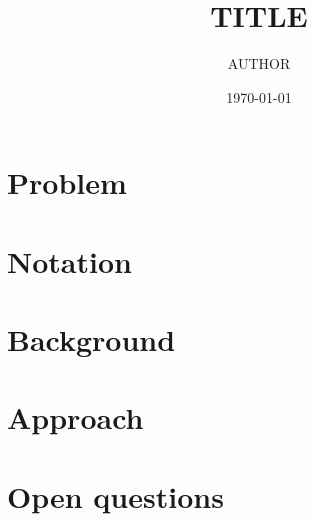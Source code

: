 \documentclass[11pt]{article}
\title{TITLE}
\author{AUTHOR}
\date{\today}
\begin{document}
\maketitle

\begin{abstract}
\end{abstract}

\section{Problem}
\label{sec:problem}

\section{Notation}
\label{sec:notation}

\section{Background}
\label{sec:background}

\section{Approach}
\label{sec:approach}

\section{Open questions}
\label{sec:open}



\end{document}

